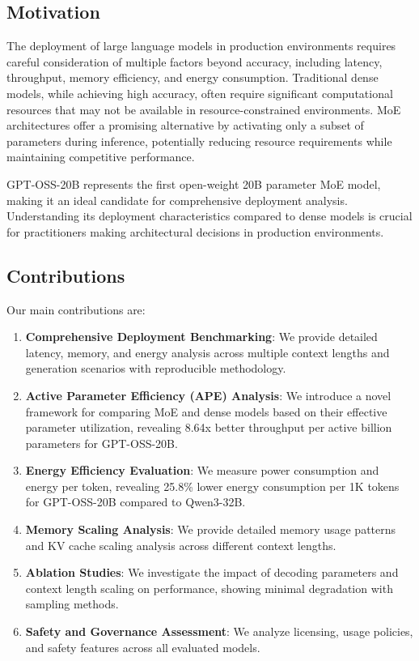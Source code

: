 \documentclass[11pt]{article}
\begin{document}
\subsection{Motivation}

The deployment of large language models in production environments requires careful consideration of multiple factors beyond accuracy, including latency, throughput, memory efficiency, and energy consumption. Traditional dense models, while achieving high accuracy, often require significant computational resources that may not be available in resource-constrained environments. MoE architectures offer a promising alternative by activating only a subset of parameters during inference, potentially reducing resource requirements while maintaining competitive performance.

GPT-OSS-20B represents the first open-weight 20B parameter MoE model, making it an ideal candidate for comprehensive deployment analysis. Understanding its deployment characteristics compared to dense models is crucial for practitioners making architectural decisions in production environments.

\subsection{Contributions}

Our main contributions are:

\begin{enumerate}
    \item \textbf{Comprehensive Deployment Benchmarking}: We provide detailed latency, memory, and energy analysis across multiple context lengths and generation scenarios with reproducible methodology.
    
    \item \textbf{Active Parameter Efficiency (APE) Analysis}: We introduce a novel framework for comparing MoE and dense models based on their effective parameter utilization, revealing 8.64x better throughput per active billion parameters for GPT-OSS-20B.
    
    \item \textbf{Energy Efficiency Evaluation}: We measure power consumption and energy per token, revealing 25.8\% lower energy consumption per 1K tokens for GPT-OSS-20B compared to Qwen3-32B.
    
    \item \textbf{Memory Scaling Analysis}: We provide detailed memory usage patterns and KV cache scaling analysis across different context lengths.
    
    \item \textbf{Ablation Studies}: We investigate the impact of decoding parameters and context length scaling on performance, showing minimal degradation with sampling methods.
    
    \item \textbf{Safety and Governance Assessment}: We analyze licensing, usage policies, and safety features across all evaluated models.
\end{enumerate}
\end{document}
